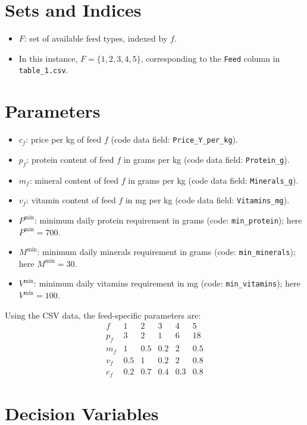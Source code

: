 \section*{Sets and Indices}

\begin{itemize}
    \item $F$: set of available feed types, indexed by $f$.
    \item In this instance, $F=\{1,2,3,4,5\}$, corresponding to the \texttt{Feed} column in \texttt{table\_1.csv}.
\end{itemize}

\section*{Parameters}

\begin{itemize}
    \item $c_f$: price per kg of feed $f$ (code data field: \texttt{Price\_Y\_per\_kg}).
    \item $p_f$: protein content of feed $f$ in grams per kg (code data field: \texttt{Protein\_g}).
    \item $m_f$: mineral content of feed $f$ in grams per kg (code data field: \texttt{Minerals\_g}).
    \item $v_f$: vitamin content of feed $f$ in mg per kg (code data field: \texttt{Vitamins\_mg}).
    \item $P^{\min}$: minimum daily protein requirement in grams (code: \texttt{min\_protein}); here $P^{\min}=700$.
    \item $M^{\min}$: minimum daily minerals requirement in grams (code: \texttt{min\_minerals}); here $M^{\min}=30$.
    \item $V^{\min}$: minimum daily vitamins requirement in mg (code: \texttt{min\_vitamins}); here $V^{\min}=100$.
\end{itemize}

Using the CSV data, the feed-specific parameters are:
\[
\begin{array}{c|ccccc}
f & 1 & 2 & 3 & 4 & 5\\
\hline
p_f & 3 & 2 & 1 & 6 & 18\\
m_f & 1 & 0.5 & 0.2 & 2 & 0.5\\
v_f & 0.5 & 1 & 0.2 & 2 & 0.8\\
c_f & 0.2 & 0.7 & 0.4 & 0.3 & 0.8
\end{array}
\]

\section*{Decision Variables}

